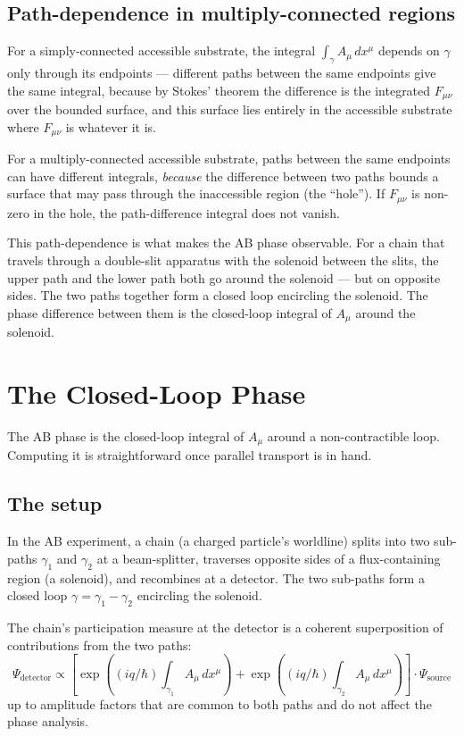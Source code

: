 \documentclass[11pt,a4paper]{article}
\begin{document}
\subsection{Path-dependence in multiply-connected regions}

For a simply-connected accessible substrate, the integral $\int_\gamma A_\mu \, dx^\mu$ depends on $\gamma$ only through its endpoints --- different paths between the same endpoints give the same integral, because by Stokes' theorem the difference is the integrated $F_{\mu\nu}$ over the bounded surface, and this surface lies entirely in the accessible substrate where $F_{\mu\nu}$ is whatever it is.

For a multiply-connected accessible substrate, paths between the same endpoints can have different integrals, \emph{because} the difference between two paths bounds a surface that may pass through the inaccessible region (the ``hole''). If $F_{\mu\nu}$ is non-zero in the hole, the path-difference integral does not vanish.

This path-dependence is what makes the AB phase observable. For a chain that travels through a double-slit apparatus with the solenoid between the slits, the upper path and the lower path both go around the solenoid --- but on opposite sides. The two paths together form a closed loop encircling the solenoid. The phase difference between them is the closed-loop integral of $A_\mu$ around the solenoid.

\section{The Closed-Loop Phase}

The AB phase is the closed-loop integral of $A_\mu$ around a non-contractible loop. Computing it is straightforward once parallel transport is in hand.

\subsection{The setup}

In the AB experiment, a chain (a charged particle's worldline) splits into two sub-paths $\gamma_1$ and $\gamma_2$ at a beam-splitter, traverses opposite sides of a flux-containing region (a solenoid), and recombines at a detector. The two sub-paths form a closed loop $\gamma = \gamma_1 - \gamma_2$ encircling the solenoid.

The chain's participation measure at the detector is a coherent superposition of contributions from the two paths:
\[
\Psi_{\mathrm{detector}} \propto \left[\exp\!\left((iq/\hbar) \int_{\gamma_1} A_\mu \, dx^\mu\right) + \exp\!\left((iq/\hbar) \int_{\gamma_2} A_\mu \, dx^\mu\right)\right] \cdot \Psi_{\mathrm{source}}
\]
up to amplitude factors that are common to both paths and do not affect the phase analysis.
\end{document}
